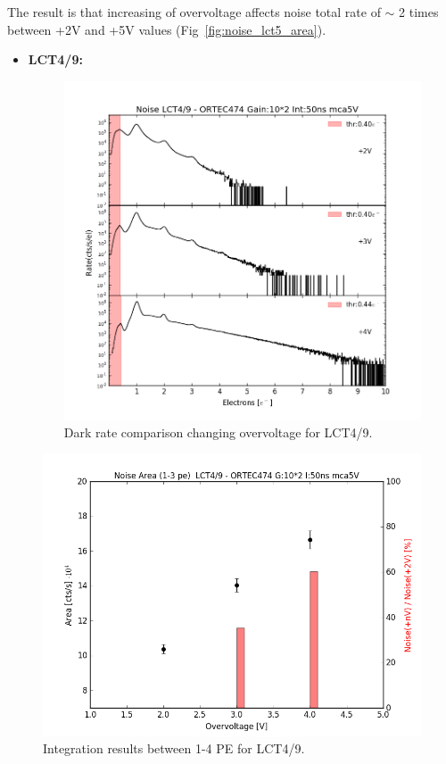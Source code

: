 \documentclass[10pt,a4paper, openany]{book}
\begin{document}
The result is that increasing of overvoltage affects noise total rate of $\sim$ 2 times between +2V and +5V values (Fig~\ref{fig:noise_lct5_area}).

\newpage 
\begin{itemize}
\item \textbf{LCT4/9:}

\begin{figure}[!h]
\begin{center}
\includegraphics[scale=0.45]{imm/noise_lct49.png}
\end{center}
\caption{Dark rate comparison changing overvoltage for LCT4/9.} 
\label{fig:noise_lct49}
\end{figure}
\end{itemize}

\begin{figure}[!h]
\begin{center}
\includegraphics[scale=0.45]{imm/noise_lct49_area.png}
\end{center}
\caption{Integration results between 1-4 PE for LCT4/9.} 
\label{fig:noise_lct49_area}
\end{figure}
\end{document}
